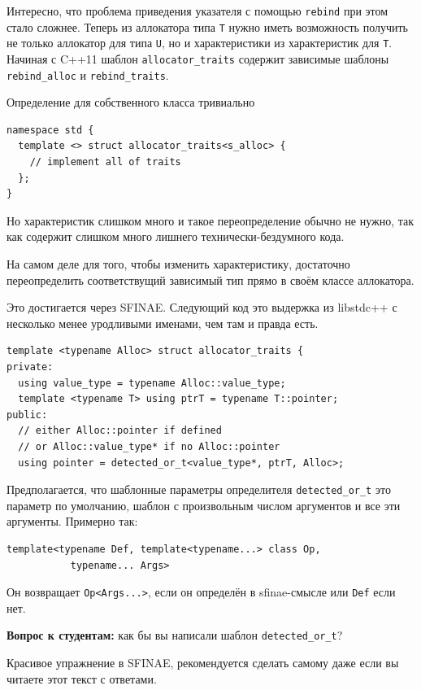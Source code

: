 \documentclass[a4paper,12pt,oneside]{book}
\newif\ifanswers
\begin{document}
Интересно, что проблема приведения указателя с помощью \lstinline!rebind! при этом стало сложнее. Теперь из аллокатора типа \lstinline!T! нужно иметь возможность получить не только аллокатор для типа \lstinline!U!, но и характеристики из характеристик для \lstinline!T!. Начиная с C++11 шаблон \lstinline!allocator_traits! содержит зависимые шаблоны \lstinline!rebind_alloc! и \lstinline!rebind_traits!.

Определение для собственного класса тривиально

\begin{lstlisting}
namespace std {
  template <> struct allocator_traits<s_alloc> {
    // implement all of traits
  };
}
\end{lstlisting}

Но характеристик слишком много и такое переопределение обычно не нужно, так как содержит слишком много лишнего технически-бездумного кода.

На самом деле для того, чтобы изменить характеристику, достаточно переопределить соответствущий зависимый тип прямо в своём классе аллокатора.

Это достигается через SFINAE. Следующий код это выдержка из libstdc++ с несколько менее уродливыми именами, чем там и правда есть.

\begin{lstlisting}
template <typename Alloc> struct allocator_traits {
private:
  using value_type = typename Alloc::value_type;
  template <typename T> using ptrT = typename T::pointer;
public:
  // either Alloc::pointer if defined
  // or Alloc::value_type* if no Alloc::pointer
  using pointer = detected_or_t<value_type*, ptrT, Alloc>;
\end{lstlisting}

Предполагается, что шаблонные параметры определителя \lstinline!detected_or_t! это параметр по умолчанию, шаблон с произвольным числом аргументов и все эти аргументы. Примерно так:

\begin{lstlisting}
template<typename Def, template<typename...> class Op,
	       typename... Args>
\end{lstlisting}

Он возвращает \lstinline!Op<Args...>!, если он определён в sfinae-смысле или \lstinline!Def! если нет. 

\textbf{Вопрос к студентам:} как бы вы написали шаблон \lstinline!detected_or_t!?

\ifanswers
Красивое упражнение в SFINAE, рекомендуется сделать самому даже если вы читаете этот текст с ответами.
\end{document}
